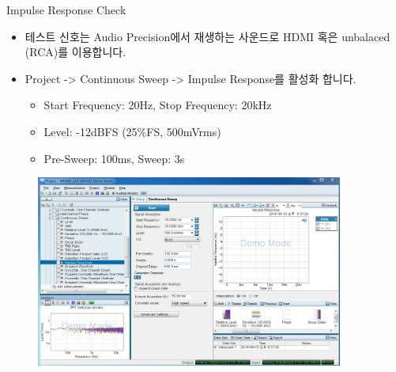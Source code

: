 \documentclass{beamer}
\begin{document}
\begin{frame}[t]{Impulse Response Check}
\begin{itemize}
\item 테스트 신호는 Audio Precision에서 재생하는 사운드로 HDMI 혹은 unbalaced (RCA)를 이용합니다.
\item Project -> Continuous Sweep -> Impulse Response를 활성화 합니다.
  \begin{itemize}
  \item Start Frequency: 20Hz, Stop Frequency: 20kHz
  \item Level: -12dBFS (25\%FS, 500mVrms)
  \item Pre-Sweep: 100ms, Sweep: 3s
  \end{itemize}
\end{itemize}

\begin{figure}[r]
\includegraphics[width=0.9\textwidth]{figure/apsetting/impulseResponse.png}
\end{figure}

\end{frame}
\end{document}
